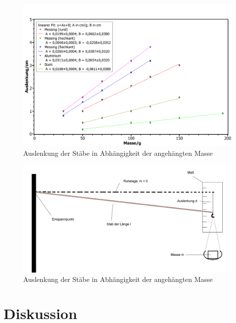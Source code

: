		\begin{figure}[ht]
			\centering
			\includegraphics[width=\textwidth]{StabAuslenkungen.pdf}
			\caption{Auslenkung der Stäbe in Abhängigkeit der angehängten Masse}
			\label{abb:linearerFit}	
		\end{figure}
			
		\begin{figure}[ht]
			\centering
			\includegraphics[width=\textwidth]{StabAuslenkungSkizze.png}
			\caption{Auslenkung der Stäbe in Abhängigkeit der angehängten Masse}
			\label{abb:2}	
		\end{figure}	
		
	\section{Diskussion}